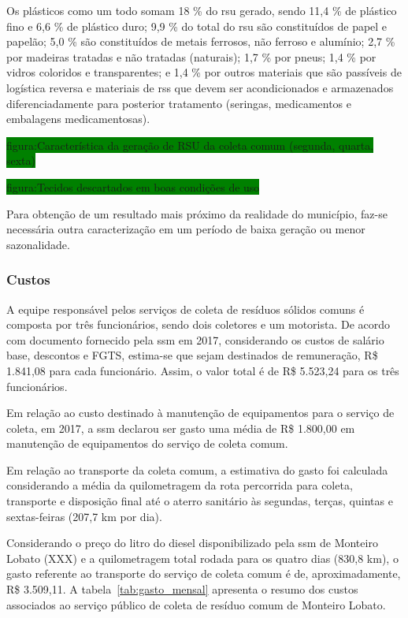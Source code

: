 	Os plásticos como um todo somam 18 \% do \gls{rsu} gerado, sendo 11,4 \% de plástico fino e 6,6 \% de plástico duro; 9,9 \% do total do \gls{rsu} são constituídos de papel e papelão; 5,0 \% são constituídos de metais ferrosos, não ferroso e alumínio; 2,7 \% por madeiras tratadas e não tratadas (naturais); 1,7 \% por pneus; 1,4 \% por vidros coloridos e transparentes; e 1,4 \% por outros materiais que são passíveis de logística reversa e  materiais de \gls{rss} que devem ser acondicionados e armazenados diferenciadamente para posterior tratamento (seringas, medicamentos e embalagens medicamentosas).
	
	\colorbox{green}{figura:Característica da geração de RSU da coleta comum (segunda, quarta, sexta)}
	
	\colorbox{green}{figura:Tecidos descartados em boas condições de uso}
	
	Para obtenção de um resultado mais próximo da realidade do município, faz-se necessária outra caracterização em um período de baixa geração ou menor sazonalidade.
	
	\subsubsection{Custos}
	
	A equipe responsável pelos serviços de coleta de resíduos sólidos comuns é composta por três funcionários, sendo dois coletores e um motorista. De acordo com documento fornecido pela \gls{ssm} em 2017, considerando os custos de salário base, descontos e FGTS, estima-se que sejam destinados de remuneração, R\$ 1.841,08 para cada funcionário. Assim, o valor total é de R\$ 5.523,24 para os três funcionários.
	
	Em relação ao custo destinado à manutenção de equipamentos para o serviço de coleta, em 2017, a \gls{ssm} declarou ser gasto uma média de R\$ 1.800,00 em manutenção de equipamentos do serviço de coleta comum.
	
	Em relação ao transporte da coleta comum, a estimativa do gasto foi calculada considerando a média da quilometragem da rota percorrida para coleta, transporte e disposição final até o aterro sanitário às segundas, terças, quintas e sextas-feiras (207,7 km por dia). 
	
	Considerando o preço do litro do diesel disponibilizado pela \gls{ssm} de Monteiro Lobato (XXX) e a quilometragem total rodada para os quatro dias (830,8 km), o gasto referente ao transporte do serviço de coleta comum é de, aproximadamente, R\$ 3.509,11. A tabela~\ref{tab:gasto_mensal} apresenta o resumo dos custos associados ao serviço público de coleta de resíduo comum de Monteiro Lobato.
	
